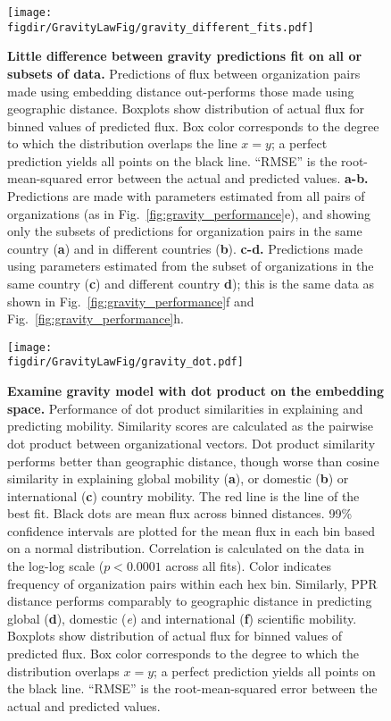 \documentclass[12pt]{article} %
\def\figdir{../Figs}
\begin{document}
%
%
\begin{figure}[p!]
	\centering
	\texttt{[image: \\figdir/GravityLawFig/gravity\_different\_fits.pdf]}
	\caption{
		\textbf{Little difference between gravity predictions fit on all or subsets of data.}
		Predictions of flux between organization pairs made using embedding distance out-performs those made using geographic distance.
		Boxplots show distribution of actual flux for binned values of predicted flux.
		Box color corresponds to the degree to which the distribution overlaps the line $x = y$; 
		a perfect prediction yields all points on the black line.
		``RMSE'' is the root-mean-squared error between the actual and predicted values.
		\textbf{a-b.} Predictions are made with parameters estimated from all pairs of organizations (as in Fig.~\ref{fig:gravity_performance}e), and showing only the subsets of predictions for organization pairs in the same country (\textbf{a}) and in different countries (\textbf{b}).
		\textbf{c-d.} Predictions made using parameters estimated from the subset of organizations in the same country (\textbf{c}) and different country \textbf{d});
		this is the same data as shown in Fig.~\ref{fig:gravity_performance}f and Fig.~\ref{fig:gravity_performance}h.
	}
	\label{fig:supp:gravity_prediction_subsets}
\end{figure}



%
%
\begin{figure}[p!]
	\centering
	\texttt{[image: \\figdir/GravityLawFig/gravity\_dot.pdf]}
	\caption{
		\textbf{Examine gravity model with dot product on the embedding space.}
		Performance of dot product similarities in explaining and predicting mobility.
		Similarity scores are calculated as the pairwise dot product between organizational vectors.
		Dot product similarity performs better than geographic distance, though worse than cosine similarity in explaining global mobility (\textbf{a}), or domestic (\textbf{b}) or international (\textbf{c}) country mobility.
		The red line is the line of the best fit.
		Black dots are mean flux across binned distances.
		99\% confidence intervals are plotted for the mean flux in each bin based on a normal distribution. 
		Correlation is calculated on the data in the log-log scale ($p < 0.0001$ across all fits).
		Color indicates frequency of organization pairs within each hex bin.
		Similarly, PPR distance performs comparably to geographic distance in predicting global (\textbf{d}), domestic (\textit{e}) and international (\textbf{f}) scientific mobility.
		Boxplots show distribution of actual flux for binned values of predicted flux.
		Box color corresponds to the degree to which the distribution overlaps $x = y$;
		a perfect prediction yields all points on the black line.
		``RMSE'' is the root-mean-squared error between the actual and predicted values.
	}
	\label{fig:supp:gravity_dot}
\end{figure}
\end{document}
